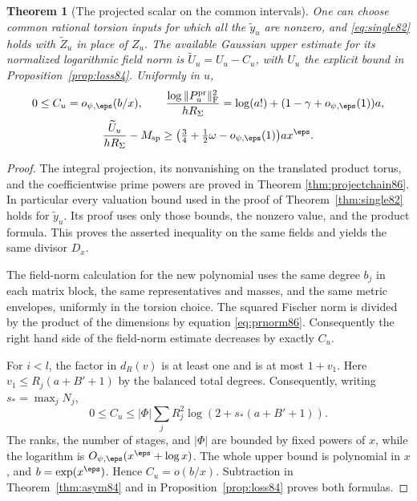 \documentclass[a4paper,11pt]{article}
\newtheorem{theorem}[proposition]{Theorem}
\theoremstyle{definition}
\theoremstyle{remark}
\numberwithin{equation}{section}
\begin{document}
\begin{theorem}[The projected scalar on the common intervals]
\label{thm:project87}
One can choose common rational torsion inputs for which all the
\(\widetilde y_u\) are nonzero, and \eqref{eq:single82} holds
with \(\widetilde Z_u\) in place of \(Z_u\). The available
Gaussian upper estimate for its normalized logarithmic field norm
is \(\widetilde U_u=U_u-C_u\), with \(U_u\) the explicit bound
in Proposition~\ref{prop:loss84}. Uniformly in \(u\),
\begin{gather}
 0\le C_u=o_{\psi,\eps}(b/x), \qquad
 \frac{\log\|P^{\rm pr}_u\|_{\rm F}^2}{hR_\Sigma}
       =\log(a!)+(1-\gamma+o_{\psi,\eps}(1))a, \notag\\
 \frac{\widetilde U_u}{hR_\Sigma}-M_{\rm sp}
       \ge \bigl(\tfrac34+\tfrac12\omega-o_{\psi,\eps}(1)\bigr)
                     a x^\eps.                             \label{eq:proj87}
\end{gather}
\end{theorem}
\begin{proof}
The integral projection, its nonvanishing on the translated
product torus, and the coefficientwise prime powers are proved in
Theorem \ref{thm:projectchain86}.
In particular every valuation bound used in the proof of
Theorem~\ref{thm:single82} holds for \(\widetilde y_u\). Its
proof uses only those bounds, the nonzero value, and the product
formula. This proves the asserted inequality on the same fields
and yields the same divisor \(D_x\).

The field-norm calculation for the new polynomial uses the same
degree \(b_j\) in each matrix block, the same representatives
and masses, and the same metric envelopes, uniformly in the
torsion choice. The squared Fischer norm is divided by the
product of the dimensions by equation \ref{eq:prnorm86}.
Consequently the right hand side of the field-norm estimate
decreases by exactly \(C_u\).

For \(i<l\), the factor in \(d_R(v)\) is at least one and is
at most \(1+v_1\). Here \(v_1\le R_j(a+B'+1)\) by the balanced
total degrees. Consequently, writing \(s_*=\max_j N_j\),
\[
    0\le C_u\le |\Phi|\sum_j R_j^2
                           \log(2+s_*(a+B'+1)).
\]
The ranks, the number of stages, and \(|\Phi|\) are bounded by
fixed powers of \(x\), while the logarithm is
\(O_{\psi,\eps}(x^\eps+\log x)\). The whole upper bound is
polynomial in \(x\), and \(b=\exp(x^\eps)\). Hence \(C_u=o(b/x)\).
Subtraction in Theorem~\ref{thm:asym84} and in
Proposition~\ref{prop:loss84} proves both formulas.
\end{proof}
\end{document}
